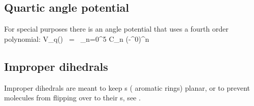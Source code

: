 \subsection{Quartic angle potential}
\label{subsec:quarticangle}
For special purposes there is an angle potential
that uses a fourth order polynomial:
\beq
V_q(\tijk) ~=~ \sum_{n=0}^5 C_n (\tijk-\tijk^0)^n
\eeq

\newcommand{\rvkj}{{\bf r}_{kj}}
\newcommand{\rkj}{r_{kj}}

\subsection{Improper dihedrals}
\label{sec:imp}
Improper dihedrals are meant to keep s ({\eg} 
aromatic rings) planar, or to prevent molecules from flipping over to their
s, see .

